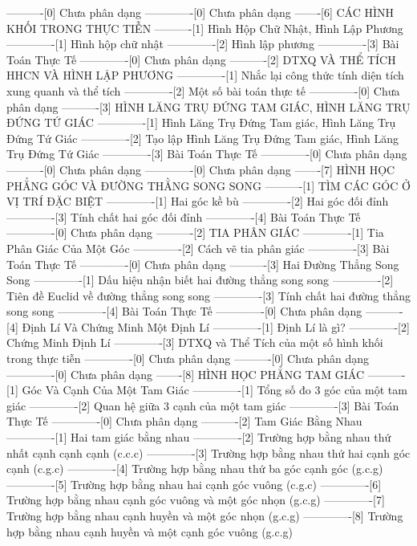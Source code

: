 ----------[0] Chưa phân dạng
-------------[0] Chưa phân dạng
-------[6] CÁC HÌNH KHỐI TRONG THỰC TIỄN
----------[1] Hình Hộp Chữ Nhật, Hình Lập Phương
-------------[1] Hình hộp chữ nhật
-------------[2] Hình lập phương
-------------[3] Bài Toán Thực Tế
-------------[0] Chưa phân dạng
----------[2] DTXQ VÀ THỂ TÍCH HHCN VÀ HÌNH LẬP PHƯƠNG
-------------[1] Nhắc lại công thức tính diện tích xung quanh và thể tích
-------------[2] Một số bài toán thực tế
-------------[0] Chưa phân dạng
----------[3] HÌNH LĂNG TRỤ ĐỨNG TAM GIÁC, HÌNH LĂNG TRỤ ĐỨNG TỨ GIÁC
-------------[1] Hình Lăng Trụ Đứng Tam giác, Hình Lăng Trụ Đứng Tứ Giác
-------------[2] Tạo lập Hình Lăng Trụ Đứng Tam giác, Hình Lăng Trụ Đứng Tứ Giác
-------------[3] Bài Toán Thực Tế
-------------[0] Chưa phân dạng
----------[0] Chưa phân dạng
-------------[0] Chưa phân dạng
-------[7] HÌNH HỌC PHẲNG GÓC VÀ ĐƯỜNG THẰNG SONG SONG
----------[1] TÌM CÁC GÓC Ở VỊ TRÍ ĐẶC BIỆT
-------------[1] Hai góc kề bù
-------------[2] Hai góc đối đỉnh
-------------[3] Tính chất hai góc đối đỉnh
-------------[4] Bài Toán Thực Tế
-------------[0] Chưa phân dạng
----------[2] TIA PHÂN GIÁC
-------------[1] Tia Phân Giác Của Một Góc
-------------[2] Cách vẽ tia phân giác
-------------[3] Bài Toán Thực Tế
-------------[0] Chưa phân dạng
----------[3] Hai Đường Thẳng Song Song
-------------[1] Dấu hiệu nhận biết hai đường thẳng song song
-------------[2] Tiên đề Euclid về đường thẳng song song
-------------[3] Tính chất hai đường thẳng song song 
-------------[4] Bài Toán Thực Tế
-------------[0] Chưa phân dạng
----------[4] Định Lí Và Chứng Minh Một Định Lí
-------------[1] Định Lí là gì?
-------------[2] Chứng Minh Định Lí
-------------[3] DTXQ và Thể Tích của một số hình khối trong thực tiễn
-------------[0] Chưa phân dạng
----------[0] Chưa phân dạng
-------------[0] Chưa phân dạng
-------[8] HÌNH HỌC PHẲNG TAM GIÁC
----------[1] Góc Và Cạnh Của Một Tam Giác
-------------[1] Tổng số đo 3 góc của một tam giác
-------------[2] Quan hệ giữa 3 cạnh của một tam giác
-------------[3] Bài Toán Thực Tế
-------------[0] Chưa phân dạng
----------[2] Tam Giác Bằng Nhau
-------------[1] Hai tam giác bằng nhau
-------------[2] Trường hợp bằng nhau thứ nhất cạnh cạnh cạnh (c.c.c)
-------------[3] Trường hợp bằng nhau thứ hai cạnh góc cạnh (c.g.c)
-------------[4] Trường hợp bằng nhau thứ ba góc cạnh góc (g.c.g)
-------------[5] Trường hợp bằng nhau hai cạnh góc vuông (c.g.c)
-------------[6] Trường hợp bằng nhau cạnh góc vuông và một góc nhọn (g.c.g)
-------------[7] Trường hợp bằng nhau cạnh huyền và một góc nhọn (g.c.g)
-------------[8] Trường hợp bằng nhau cạnh huyền và một cạnh góc vuông (g.c.g)
